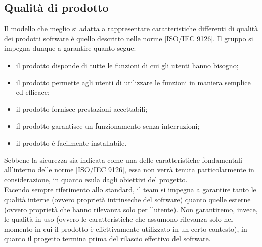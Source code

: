 	\subsection{Qualità di prodotto}
		Il modello che meglio si adatta a rappresentare caratteristiche differenti di qualità dei prodotti software è quello descritto nelle norme 
		[ISO/IEC 9126]. Il gruppo \groupname{} si impegna dunque a garantire quanto segue:
		\begin{itemize}
			\item il prodotto disponde di tutte le funzioni di cui gli utenti hanno bisogno;
			\item il prodotto permette agli utenti di utilizzare le funzioni in maniera semplice ed efficace;
			\item il prodotto fornisce prestazioni accettabili;
			\item il prodotto garantisce un funzionamento senza interruzioni;
			\item il prodotto è facilmente installabile.
		\end{itemize}
		Sebbene la sicurezza sia indicata come una delle caratteristiche fondamentali all'interno delle norme [ISO/IEC 9126], essa non verrà tenuta 
		particolarmente in considerazione, in quanto esula dagli obiettivi del progetto.\\
		Facendo sempre riferimento allo standard, il team si impegna a garantire tanto le qualità interne (ovvero proprietà intrinseche del software) 
		quanto quelle esterne (ovvero proprietà che hanno rilevanza solo per l'utente). Non garantiremo, invece, le qualità in uso (ovvero le 
		caratteristiche che assumono rilevanza solo nel momento in cui il prodotto è effettivamente utilizzato in un certo contesto), in quanto il 
		progetto termina prima del rilascio effettivo del software.
